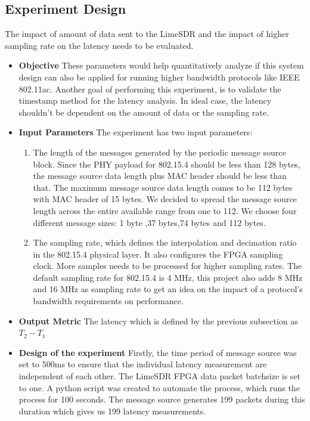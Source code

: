 \subsection{Experiment Design} \label{exp1}
The impact of amount of data sent to the LimeSDR and the impact of higher sampling rate on the latency needs to be evaluated.
\begin{itemize}
    \item {\textbf{Objective} These parameters would help quantitatively analyze if this system design can also be applied for running higher bandwidth protocols like IEEE 802.11ac.
Another goal of performing this experiment, is to validate the timestamp method for the latency analysis.
In ideal case, the latency shouldn't be dependent on the amount of data or the sampling rate.}
\item{\textbf{Input Parameters} The experiment has two input parameters:
\begin{enumerate}
    \item {The length of the messages generated by the periodic message source block.
    Since the PHY payload for 802.15.4 should be less than 128 bytes, the message source data length plus MAC header should be less than that.
    The maximum message source data length comes to be 112 bytes with MAC header of 15 bytes.
    We decided to spread the message source length across the entire available range from one to 112.
    We choose four different message sizes: 1 byte ,37 bytes,74 bytes and 112 bytes.}
    \item {The sampling rate, which defines the interpolation and decimation ratio in the 802.15.4 physical layer.
    It also configures the FPGA sampling clock.
    More samples needs to be processed for higher sampling rates.
    The default sampling rate for 802.15.4 is 4 MHz, this project also adds 8 MHz and 16 MHz as sampling rate to get an idea on the impact of a protocol's bandwidth requirements on performance.
    }
\end{enumerate}
}
\item{\textbf{Output Metric} The latency which is defined by the previous subsection as $T_2 - T_1$}
\item{\textbf{Design of the experiment} Firstly, the time period of message source was set to 500ms to ensure that the individual latency measurement are independent of each other.
The LimeSDR FPGA data packet batchsize is set to one.
A python script was created to automate the process, which runs the process for 100 seconds.
The message source generates 199 packets during this duration which gives us 199 latency measurements.
}
\end{itemize}

